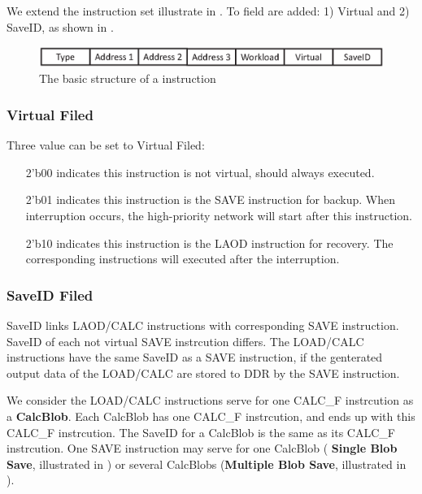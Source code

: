 We extend the instruction set illustrate in . To field are added: 1) Virtual and 2) SaveID, as shown in  .

\begin{figure}[h]
	\centering
	\includegraphics[width=0.9\linewidth]{fig/virtual_instr.eps}
	\caption{The basic structure of a instruction }
	\label{fig:virtual_instr}
\end{figure}

\subsubsection{ Virtual Filed}

Three value can be set to Virtual Filed:
\begin{itemize}
    \item[2'b00] indicates this instruction is not virtual, should always executed.
    \item[2'b01] indicates this instruction is the SAVE instruction for backup. When interruption occurs, the high-priority network will start after this instruction.
    \item[2'b10] indicates this instruction is the LAOD instruction for recovery. The corresponding instructions will executed after the interruption. 
\end{itemize}

\subsubsection{ SaveID Filed }

SaveID links LAOD/CALC instructions with corresponding SAVE instruction. SaveID of each not virtual SAVE instrcution differs. The LOAD/CALC instructions have the same SaveID as a SAVE instruction, if the genterated output data of the LOAD/CALC are stored to DDR by the SAVE instruction. 

We consider the LOAD/CALC instructions serve for one CALC\_F instrcution as a \textbf{CalcBlob}. Each CalcBlob has one CALC\_F instrcution, and ends up with this CALC\_F instrcution. The SaveID for a CalcBlob is the same as its CALC\_F instrcution.
One SAVE instruction may serve for one CalcBlob ( \textbf{Single Blob Save}, illustrated in  ) or several CalcBlobs (\textbf{Multiple Blob Save}, illustrated in ).

